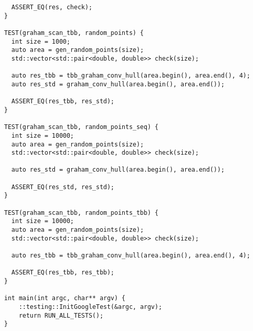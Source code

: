 \documentclass{report}
\begin{document}
\begin{lstlisting}
  ASSERT_EQ(res, check);
}

TEST(graham_scan_tbb, random_points) {
  int size = 1000;
  auto area = gen_random_points(size);
  std::vector<std::pair<double, double>> check(size);

  auto res_tbb = tbb_graham_conv_hull(area.begin(), area.end(), 4);
  auto res_std = graham_conv_hull(area.begin(), area.end());

  ASSERT_EQ(res_tbb, res_std);
}

TEST(graham_scan_tbb, random_points_seq) {
  int size = 10000;
  auto area = gen_random_points(size);
  std::vector<std::pair<double, double>> check(size);

  auto res_std = graham_conv_hull(area.begin(), area.end());

  ASSERT_EQ(res_std, res_std);
}

TEST(graham_scan_tbb, random_points_tbb) {
  int size = 10000;
  auto area = gen_random_points(size);
  std::vector<std::pair<double, double>> check(size);

  auto res_tbb = tbb_graham_conv_hull(area.begin(), area.end(), 4);

  ASSERT_EQ(res_tbb, res_tbb);
}

int main(int argc, char** argv) {
    ::testing::InitGoogleTest(&argc, argv);
    return RUN_ALL_TESTS();
}

\end{lstlisting}
\end{document}
